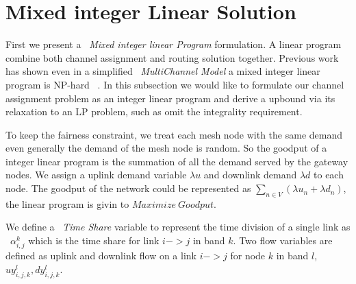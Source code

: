 \section{Mixed integer Linear Solution}
\label{sec:linearopt}

First we present a ~\emph{Mixed integer linear Program} formulation. A linear program combine both channel assignment and routing solution together. 
Previous work has shown even in a simplified ~\emph{MultiChannel Model} a mixed integer linear program is NP-hard ~\cite{marina2010topology}. In this subsection we would like to formulate our channel assignment problem as an integer linear program and derive a upbound via its relaxation to an LP problem, such as omit the integrality requirement.

To keep the fairness constraint, we treat each mesh node with the same demand even generally the demand of the mesh node is random. So the goodput of a integer linear program is the summation of all the demand served by the gateway nodes. We assign a uplink demand variable $\lambda u$ and downlink demand $\lambda d$ to each node. The goodput of the network could be represented as $\sum_{n \in V}(\lambda u_n+ \lambda d_n)$, the linear program is givin to $Maximize\ Goodput$.

We define a ~\emph{Time Share} variable to represent the time division of a single link as ~\emph{$\alpha_{i,j}^k$} which is the time share for link $i->j$ in band $k$. 
Two flow variables are defined as uplink and downlink flow on a link $i->j$ for node $k$ in band $l$, $uy_{i,j,k}^l,dy_{i,j,k}^l$.

